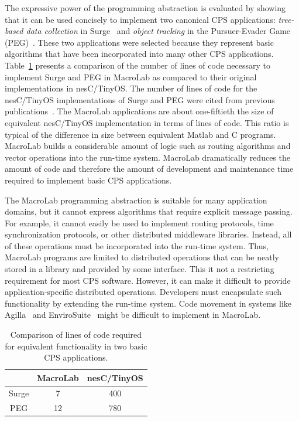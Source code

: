 The expressive power of the programming abstraction is evaluated by showing that
it can be used concisely to implement two canonical CPS applications: {\em
tree-based data collection} in Surge~\cite{Gay} and {\em object tracking} in the
Pursuer-Evader Game (PEG)~\cite{Sharp}. These two applications were selected
because they represent basic algorithms that have been incorporated into many
other CPS applications.  Table~\ref{table:LOC} presents a comparison of the
number of lines of code necessary to implement Surge and PEG in MacroLab as
compared to their original implementations in nesC/TinyOS. The number of lines
of code for the nesC/TinyOS implementations of Surge and PEG were cited from
previous publications~\cite{Muller,Kothari}.  The MacroLab applications are
about one-fiftieth the size of equivalent nesC/TinyOS implementation in terms of
lines of code. This ratio is typical of the difference in size between
equivalent Matlab and C programs. MacroLab builds a considerable amount of logic
such as routing algorithms and vector operations into the run-time
system. MacroLab dramatically reduces the amount of code and therefore the
amount of development and maintenance time required to implement basic CPS
applications.

The MacroLab programming abstraction is suitable for many application domains,
but it cannot express algorithms that require explicit message passing. For
example, it cannot easily be used to implement routing protocols, time
synchronization protocols, or other distributed middleware libraries.  Instead,
all of these operations must be incorporated into the run-time system. Thus,
MacroLab programs are limited to distributed operations that can be neatly
stored in a library and provided by some interface. This it not a restricting
requirement for most CPS software. However, it can make it difficult to provide
application-specific distributed operations. Developers must encapsulate such
functionality by extending the run-time system. Code movement in systems like
Agilla~\cite{Fok} and EnviroSuite~\cite{Luo} might be difficult to implement in
MacroLab.

\begin{table}[!htb]
\centering
\begin{minipage}{\columnwidth}
\centering
\begin{tabular}{|c|c|c|}
\cline{2-3}
\multicolumn{1}{c|}{}&MacroLab&nesC/TinyOS\\
\hline
Surge&7&400\\
\hline
PEG&12&780\\
\hline
\end{tabular}
\end{minipage}
\caption[Lines of code (LOC) comparison]{Comparison of lines of code required for equivalent
functionality in two basic CPS applications.}
\label{table:LOC}
\end{table}

